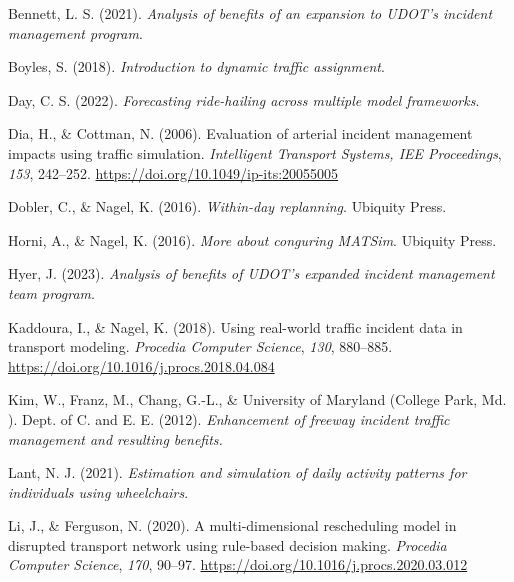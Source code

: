 \documentclass[fancy, oneside, mastersfancy, ms]{byuthesis}
\newlength{\cslhangindent}
\newlength{\cslentryspacingunit} %
\newenvironment{CSLReferences}[2] %
 {%
  \setlength{\parindent}{0pt}
  \ifodd #1
  \let\oldpar\par
  \def\par{\hangindent=\cslhangindent\oldpar}
  \fi
  \setlength{\parskip}{#2\cslentryspacingunit}
 }%
 {}
\begin{document}

\hypertarget{refs}{}
\begin{CSLReferences}{1}{0}
\leavevmode{}%
Bennett, L. S. (2021). \emph{Analysis of benefits of an expansion to
UDOT's incident management program}.

\leavevmode{}%
Boyles, S. (2018). \emph{Introduction to dynamic traffic assignment}.

\leavevmode{}%
Day, C. S. (2022). \emph{Forecasting ride-hailing across multiple model
frameworks}.

\leavevmode{}%
Dia, H., \& Cottman, N. (2006). Evaluation of arterial incident
management impacts using traffic simulation. \emph{Intelligent Transport
Systems, IEE Proceedings}, \emph{153}, 242--252.
\url{https://doi.org/10.1049/ip-its:20055005}

\leavevmode{}%
Dobler, C., \& Nagel, K. (2016). \emph{Within-day replanning}. {Ubiquity
Press}.

\leavevmode{}%
Horni, A., \& Nagel, K. (2016). \emph{More about conguring MATSim}.
{Ubiquity Press}.

\leavevmode{}%
Hyer, J. (2023). \emph{Analysis of benefits of UDOT's expanded incident
management team program}.

\leavevmode{}%
Kaddoura, I., \& Nagel, K. (2018). Using real-world traffic incident
data in transport modeling. \emph{Procedia Computer Science},
\emph{130}, 880--885. \url{https://doi.org/10.1016/j.procs.2018.04.084}

\leavevmode{}%
Kim, W., Franz, M., Chang, G.-L., \& University of Maryland (College
Park, Md. ). Dept. of C. and E. E. (2012). \emph{Enhancement of freeway
incident traffic management and resulting benefits.}

\leavevmode{}%
Lant, N. J. (2021). \emph{Estimation and simulation of daily activity
patterns for individuals using wheelchairs}.

\leavevmode{}%
Li, J., \& Ferguson, N. (2020). A multi-dimensional rescheduling model
in disrupted transport network using rule-based decision making.
\emph{Procedia Computer Science}, \emph{170}, 90--97.
\url{https://doi.org/10.1016/j.procs.2020.03.012}


\end{CSLReferences}
\end{document}
